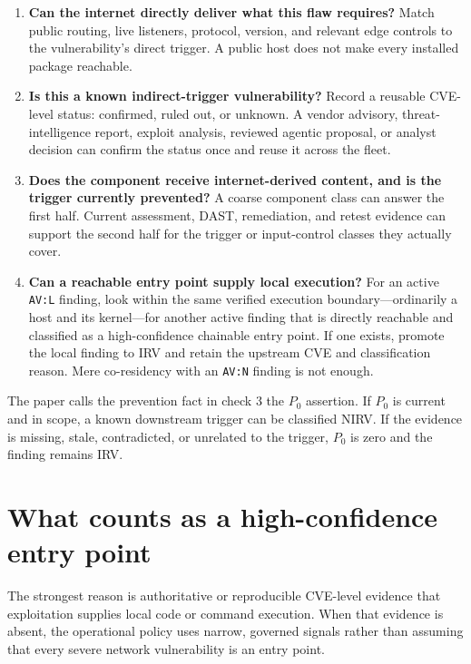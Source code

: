 \documentclass[11pt]{article}
\newcommand{\code}[1]{\texttt{#1}}
\begin{document}
\begin{enumerate}[leftmargin=1.8em]
\item \textbf{Can the internet directly deliver what this flaw requires?}
  Match public routing, live listeners, protocol, version, and relevant edge
  controls to the vulnerability's direct trigger. A public host does not make
  every installed package reachable.

\item \textbf{Is this a known indirect-trigger vulnerability?}
  Record a reusable CVE-level status: confirmed, ruled out, or unknown. A vendor
  advisory, threat-intelligence report, exploit analysis, reviewed agentic
  proposal, or analyst decision can confirm the status once and reuse it across
  the fleet.

\item \textbf{Does the component receive internet-derived content, and is the
  trigger currently prevented?}
  A coarse component class can answer the first half. Current assessment,
  DAST, remediation, and retest evidence can support the second half for the
  trigger or input-control classes they actually cover.

\item \textbf{Can a reachable entry point supply local execution?}
  For an active \code{AV:L} finding, look within the same verified execution
  boundary---ordinarily a host and its kernel---for another active finding that
  is directly reachable and classified as a high-confidence chainable entry
  point. If one exists, promote the local finding to IRV and retain the upstream
  CVE and classification reason. Mere co-residency with an \code{AV:N} finding
  is not enough.
\end{enumerate}

The paper calls the prevention fact in check 3 the $P_0$ assertion. If $P_0$ is
current and in scope, a known downstream trigger can be classified NIRV. If the
evidence is missing, stale, contradicted, or unrelated to the trigger, $P_0$ is
zero and the finding remains IRV.

\section*{What counts as a high-confidence entry point}
The strongest reason is authoritative or reproducible CVE-level evidence that
exploitation supplies local code or command execution. When that evidence is
absent, the operational policy uses narrow, governed signals rather than
assuming that every severe network vulnerability is an entry point.
\end{document}
